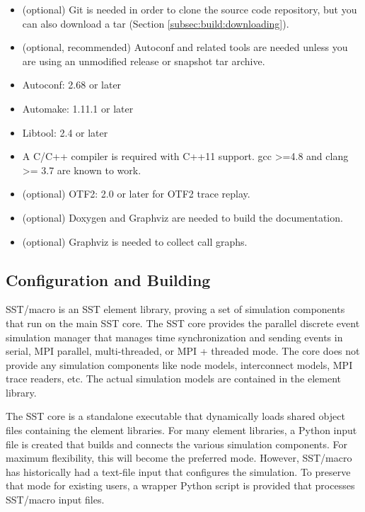 \begin{itemize}
\item (optional) Git is needed in order to clone the source code repository, but you can also download a tar (Section \ref{subsec:build:downloading}).
\item (optional, recommended) Autoconf and related tools are needed unless you are using an unmodified release or snapshot tar archive.
\item Autoconf: 2.68 or later 
\item Automake: 1.11.1 or later 
\item Libtool: 2.4 or later 
\item A C/C++ compiler is required with C++11 support.  gcc >=4.8 and clang >= 3.7 are known to work.
\item (optional) OTF2: 2.0 or later for OTF2 trace replay.
\item (optional) Doxygen and Graphviz are needed to build the documentation.
\item (optional) Graphviz is needed to collect call graphs.
\end{itemize}

\subsection{Configuration and Building}
\label{subsec:build:configure}

SST/macro is an SST element library, proving a set of simulation components that run on the main SST core.  The SST core provides the parallel discrete event simulation manager that manages time synchronization and sending events in serial, MPI parallel, multi-threaded, or MPI + threaded mode.  The core does not provide any simulation components like node models, interconnect models, MPI trace readers, etc.  The actual simulation models are contained in the element library.  

The SST core is a standalone executable that dynamically loads shared object files containing the element libraries.  For many element libraries, a Python input file is created that builds and connects the various simulation components.  For maximum flexibility, this will become the preferred mode.  However, SST/macro has historically had a text-file input  that configures the simulation.  To preserve that mode for existing users, a wrapper Python script is provided that processes SST/macro input files.  

